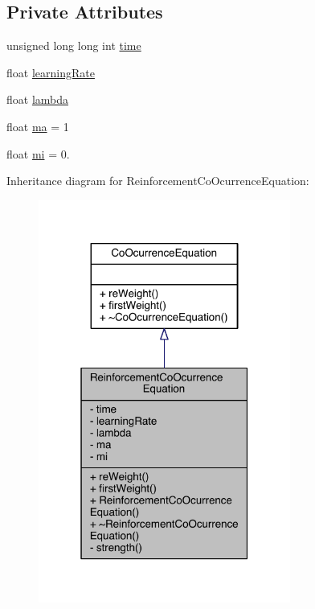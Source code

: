 \subsection*{Private Attributes}
\begin{DoxyCompactItemize}
\item 
unsigned long long int \hyperlink{class_reinforcement_co_ocurrence_equation_a12eb56a8fb3b21e292b9cd5030efda0f}{time}
\item 
float \hyperlink{class_reinforcement_co_ocurrence_equation_a643eafe5a80172a58cd54512e57d3421}{learning\+Rate}
\item 
float \hyperlink{class_reinforcement_co_ocurrence_equation_a698939519d58a0da4a079822a1d65e87}{lambda}
\item 
float \hyperlink{class_reinforcement_co_ocurrence_equation_ac25055b41571d4b146d2fd0695e642ba}{ma} = 1
\item 
float \hyperlink{class_reinforcement_co_ocurrence_equation_a31a1e4a2ba8239ddb2c08f7d24f30e29}{mi} = 0.
\end{DoxyCompactItemize}


Inheritance diagram for Reinforcement\+Co\+Ocurrence\+Equation\+:
\nopagebreak
\begin{figure}[H]
\begin{center}
\leavevmode
\includegraphics[width=235pt]{class_reinforcement_co_ocurrence_equation__inherit__graph}
\end{center}
\end{figure}


